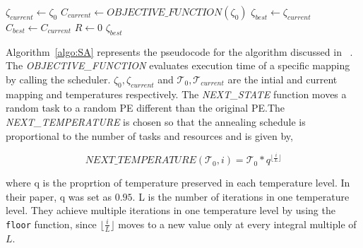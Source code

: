 \begin{scriptsize}
\begin{algorithm}[h!]
\caption{$Simulated\_Annealing(\zeta_0, \mathcal{T}_0)$}
\label{algo:SA}
{}
$\zeta_{current} \leftarrow \zeta_0$ \;
$C_{current} \leftarrow OBJECTIVE\_FUNCTION(\zeta_0)$ \;
$\zeta_{best} \leftarrow \zeta_{current}$\;
$C_{best} \leftarrow C_{current}$\;
$R \leftarrow 0$\;
\Return $\zeta_{best}$
\end{algorithm}
\end{scriptsize}

Algorithm~\ref{algo:SA} represents the pseudocode for the algorithm discussed in
~\cite{hors06}. The \textit{OBJECTIVE\_FUNCTION} evaluates execution time of a
specific mapping by calling the scheduler. $\zeta_0, \zeta_{current}$ and
$\mathcal{T}_0, \mathcal{T}_{current}$ are the intial and current mapping and
temperatures respectively. The \textit{NEXT\_STATE} function moves a random task
to a random PE different than the original PE.The \textit{NEXT\_TEMPERATURE} is
chosen so that the annealing schedule is proportional to the number of tasks and
resources and is given by,

\begin{equation}
\textit{NEXT\_TEMPERATURE}(\mathcal{T}_0, i) = \mathcal{T}_0*q^{\lfloor
\frac{i}{L} \rfloor}
\end{equation}

where q is the proprtion of temperature preserved in each temperature level. In
their paper, q was set as $0.95$. L is the number of iterations in one
temperature level. They achieve multiple iterations in one temperature level by
using the \texttt{floor} function, since $\lfloor \frac{i}{L} \rfloor$ moves to
a new value only at every integral multiple of $L$.


